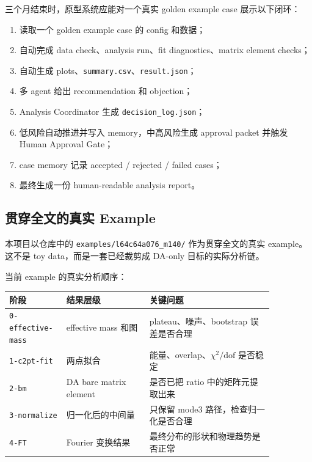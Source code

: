\documentclass[11pt,a4paper,fontset=fandol]{ctexart}
\begin{document}
三个月结束时，原型系统应能对一个真实 golden example case 展示以下闭环：

\begin{enumerate}
  \item 读取一个 golden example case 的 config 和数据；
  \item 自动完成 data check、analysis run、fit diagnostics、matrix element checks；
  \item 自动生成 plots、\texttt{summary.csv}、\texttt{result.json}；
  \item 多 agent 给出 recommendation 和 objection；
  \item Analysis Coordinator 生成 \texttt{decision\_log.json}；
  \item 低风险自动推进并写入 memory，中高风险生成 approval packet 并触发 Human Approval Gate；
  \item case memory 记录 accepted / rejected / failed cases；
  \item 最终生成一份 human-readable analysis report。
\end{enumerate}

\subsection{贯穿全文的真实 Example}

本项目以仓库中的 \lstinline|examples/l64c64a076_m140/| 作为贯穿全文的真实 example。这不是 toy data，而是一套已经裁剪成 DA-only 目标的实际分析链。

当前 example 的真实分析顺序：

\begin{center}
\begin{tabular}{p{0.16\linewidth}p{0.28\linewidth}p{0.42\linewidth}}
\toprule
阶段 & 结果层级 & 关键问题 \\
\midrule
\lstinline|0-effective-mass| & effective mass 和图 & plateau、噪声、bootstrap 误差是否合理 \\
\lstinline|1-c2pt-fit| & 两点拟合 & 能量、overlap、$\chi^2/\mathrm{dof}$ 是否稳定 \\
\lstinline|2-bm| & DA bare matrix element & 是否已把 ratio 中的矩阵元提取出来 \\
\lstinline|3-normalize| & 归一化后的中间量 & 只保留 mode3 路径，检查归一化是否合理 \\
\lstinline|4-FT| & Fourier 变换结果 & 最终分布的形状和物理趋势是否正常 \\
\bottomrule
\end{tabular}
\end{center}
\end{document}
